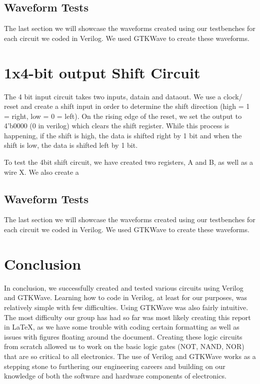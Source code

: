 \documentclass[12pt]{article}
\begin{document}




\subsection{Waveform Tests}

The last section we will showcase the waveforms created using our testbenches for each circuit we coded in Verilog. We used GTKWave to create these waveforms.






\section{1x4-bit output Shift Circuit}
The 4 bit input circuit takes two inputs, datain and dataout. We use a clock/ reset and create a shift input in order to determine the shift direction (high = 1 = right, low = 0 = left).  On the rising edge of the reset, we set the output to 4'b0000 (0 in verilog) which clears the shift register. While this process is happening, if the shift is high, the data is shifted right by 1 bit and when the shift is low, the data is shifted left by 1 bit.



To test the 4bit shift circuit, we have created two registers, A and B, as well as a wire X. We also create a 




\subsection{Waveform Tests}

The last section we will showcase the waveforms created using our testbenches for each circuit we coded in Verilog. We used GTKWave to create these waveforms.


\section{Conclusion}

In conclusion, we successfully created and tested various circuits using Verilog and GTKWave. Learning how to code in Verilog, at least for our purposes, was relatively simple with few difficulties. Using GTKWave was also fairly intuitive. The most difficulty our group has had so far was most likely creating this report in LaTeX, as we have some trouble with coding certain formatting as well as issues with figures floating around the document. Creating these logic circuits from scratch allowed us to work on the basic logic gates (NOT, NAND, NOR) that are so critical to all electronics. The use of Verilog and GTKWave works as a stepping stone to furthering our engineering careers and building on our knowledge of both the software and hardware components of electronics.
\end{document}
